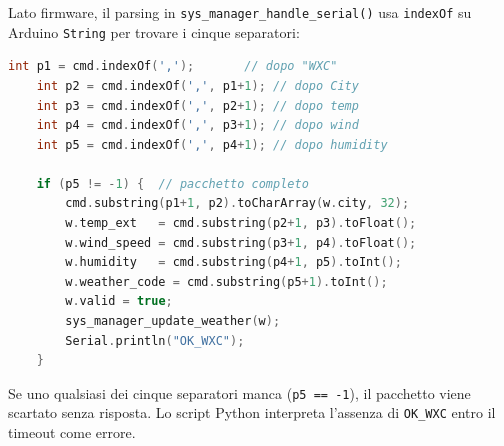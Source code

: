 Lato firmware, il parsing in \texttt{sys\_manager\_handle\_serial()} usa
\texttt{indexOf} su Arduino \texttt{String} per trovare i cinque separatori:

\begin{lstlisting}[language=C++, caption={system\_manager.cpp --- parsing WXC}]
	int p1 = cmd.indexOf(',');       // dopo "WXC"
	int p2 = cmd.indexOf(',', p1+1); // dopo City
	int p3 = cmd.indexOf(',', p2+1); // dopo temp
	int p4 = cmd.indexOf(',', p3+1); // dopo wind
	int p5 = cmd.indexOf(',', p4+1); // dopo humidity
	
	if (p5 != -1) {  // pacchetto completo
		cmd.substring(p1+1, p2).toCharArray(w.city, 32);
		w.temp_ext   = cmd.substring(p2+1, p3).toFloat();
		w.wind_speed = cmd.substring(p3+1, p4).toFloat();
		w.humidity   = cmd.substring(p4+1, p5).toInt();
		w.weather_code = cmd.substring(p5+1).toInt();
		w.valid = true;
		sys_manager_update_weather(w);
		Serial.println("OK_WXC");
	}
\end{lstlisting}

Se uno qualsiasi dei cinque separatori manca (\texttt{p5 == -1}), il pacchetto
viene scartato senza risposta. Lo script Python interpreta l'assenza di
\texttt{OK\_WXC} entro il timeout come errore.
 
